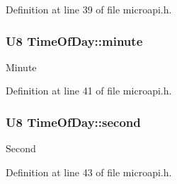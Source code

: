 Definition at line 39 of file microapi.\-h.

\hypertarget{group___microcontroller_ga21ec20909874235c6b6962ce326411d9}{
\subsubsection[{minute}]{\setlength{\rightskip}{0pt plus 5cm}U8 Time\-Of\-Day\-::minute}}\label{group___microcontroller_ga21ec20909874235c6b6962ce326411d9}
Minute 

Definition at line 41 of file microapi.\-h.

\hypertarget{group___microcontroller_ga98c2745c67f408461639d09e76db81b5}{
\subsubsection[{second}]{\setlength{\rightskip}{0pt plus 5cm}U8 Time\-Of\-Day\-::second}}\label{group___microcontroller_ga98c2745c67f408461639d09e76db81b5}
Second 

Definition at line 43 of file microapi.\-h.

